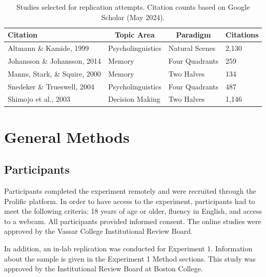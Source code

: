 \documentclass[
  man,floatsintext]{apa6}
\begin{document}
\begin{table}[tbp]

\begin{center}
\begin{threeparttable}

\caption{\label{tab:studies-table}Studies selected for replication attempts. Citation counts based on Google Scholar (May 2024).}

\small{

\begin{tabular}{llll}
\toprule
Citation & \multicolumn{1}{c}{Topic Area} & \multicolumn{1}{c}{Paradigm} & \multicolumn{1}{c}{Citations}\\
\midrule
Altmann \& Kamide, 1999 & Psycholinguistics & Natural Scenes & 2,130\\
Johansson \& Johansson, 2014 & Memory & Four Quadrants & 259\\
Manns, Stark, \& Squire, 2000 & Memory & Two Halves & 134\\
Snedeker \& Trueswell, 2004 & Psycholinguistics & Four Quadrants & 487\\
Shimojo et al., 2003 & Decision Making & Two Halves & 1,146\\
\bottomrule
\end{tabular}

}

\end{threeparttable}
\end{center}

\end{table}

\section{General Methods}\label{general-methods}

\subsection{Participants}\label{participants}

Participants completed the experiment remotely and were recruited
through the Prolific platform. In order to have access to the
experiment, participants had to meet the following criteria: 18 years of
age or older, fluency in English, and access to a webcam. All
participants provided informed consent. The online studies were approved by the
Vassar College Institutional Review Board.

In addition, an in-lab replication was conducted for Experiment 1.
Information about the sample is given in the Experiment 1 Method sections. This study was approved by the Institutional Review Board at Boston College.
\end{document}
